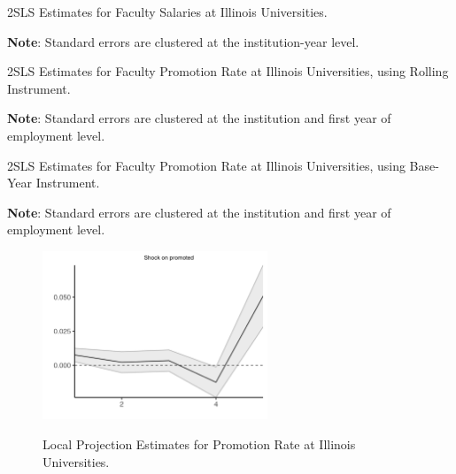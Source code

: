 \documentclass[notitlepage,12pt]{article}
\begin{document}
\begin{table}[H]
    \singlespacing
    \centering
    \caption{2SLS Estimates for Faculty Salaries at Illinois Universities.}
    \makebox[\textwidth][c]{}
    \begin{flushleft}
        \footnotesize
        \textbf{Note}: Standard errors are clustered at the institution-year level.
    \end{flushleft}
    \label{tab:facultysalaries-shock-illinois}
\end{table}

\begin{table}[H]
    \singlespacing
    \centering
    \caption{2SLS Estimates for Faculty Promotion Rate at Illinois Universities, using Rolling Instrument.}
    \makebox[\textwidth][c]{}
    \begin{flushleft}
        \footnotesize
        \textbf{Note}: Standard errors are clustered at the institution and first year of employment level.
    \end{flushleft}
    \label{tab:promotion-shock-illinois-rolling}
\end{table}

\begin{table}[H]
    \singlespacing
    \centering
    \caption{2SLS Estimates for Faculty Promotion Rate at Illinois Universities, using Base-Year Instrument.}
    \makebox[\textwidth][c]{}
    \begin{flushleft}
        \footnotesize
        \textbf{Note}: Standard errors are clustered at the institution and first year of employment level.
    \end{flushleft}
    \label{tab:promotion-shock-illinois}
\end{table}

\begin{figure}[H]
    \centering
    \singlespacing
    \caption{Local Projection Estimates for Promotion Rate at Illinois Universities.}
    \includegraphics[width=0.6\textwidth]{figures/promoted-illinois-lp-rolling.png}
    \label{fig:promoted-illinois-lp}
\end{figure}
\end{document}

